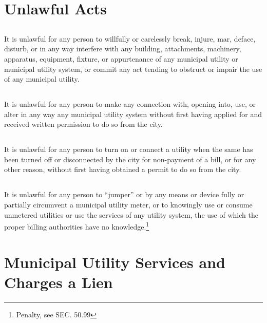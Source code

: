 \section{Unlawful Acts}
\subsection{}
It is unlawful for any person to willfully or carelessly break, injure, mar, deface, disturb, or in any way interfere with any building, attachments, machinery, apparatus, equipment, fixture, or appurtenance of any municipal utility or municipal utility system, or commit any act tending to obstruct or impair the use of any municipal utility.
\subsection{}
It is unlawful for any person to make any connection with, opening into, use, or alter in any way any municipal utility system without first having applied for and received written permission to do so from the city.
\subsection{}
It is unlawful for any person to turn on or connect a utility when the same has been turned off or disconnected by the city for non-payment of a bill, or for any other reason, without first having obtained a permit to do so from the city.
\subsection{}
It is unlawful for any person to “jumper” or by any means or device fully or partially circumvent a municipal utility meter, or to knowingly use or consume unmetered utilities or use the services of any utility system, the use of which the proper billing authorities have no knowledge.\footnote{Penalty, see SEC. 50.99}

\section{Municipal Utility Services and Charges a Lien}

